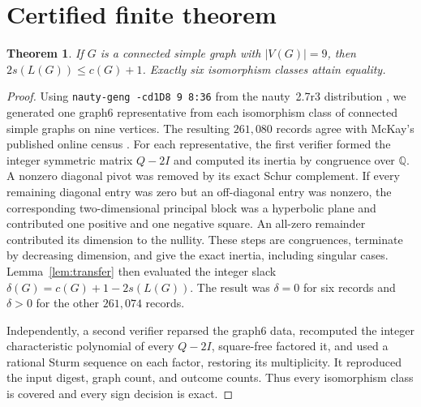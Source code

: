 \documentclass[11pt]{amsart}
\newtheorem{theorem}{Theorem}[section]
\begin{document}
\section{Certified finite theorem}
\begin{theorem}\label{thm:main}
If $G$ is a connected simple graph with $|V(G)|=9$, then
$2s(L(G))\leq c(G)+1$. Exactly six isomorphism classes attain equality.
\end{theorem}
\begin{proof}
Using \texttt{nauty-geng -cd1D8 9 8:36} from the nauty~2.7r3 distribution
\cite{McKay_2014,NautyGuide}, we generated one graph6 representative from
each isomorphism class of connected simple graphs on nine vertices. The
resulting $261{,}080$ records agree with McKay's published online census
\cite{McKayData}. For each representative, the first verifier formed the integer
symmetric matrix $Q-2I$ and computed its inertia by congruence over
$\mathbb Q$. A nonzero diagonal pivot was removed by its exact Schur
complement. If every remaining diagonal entry was zero but an off-diagonal
entry was nonzero, the corresponding two-dimensional principal block was a
hyperbolic plane and contributed one positive and one negative square. An
all-zero remainder contributed its dimension to the nullity. These steps are
congruences, terminate by decreasing dimension, and give the exact inertia,
including singular cases. Lemma~\ref{lem:transfer} then evaluated the integer
slack $\delta(G)=c(G)+1-2s(L(G))$. The result was $\delta=0$ for six records
and $\delta>0$ for the other $261{,}074$ records.

Independently, a second verifier reparsed the graph6 data, recomputed the
integer characteristic polynomial of every $Q-2I$, square-free factored it,
and used a rational Sturm sequence on each factor, restoring its
multiplicity. It reproduced the input digest, graph count, and outcome
counts. Thus every isomorphism class is covered and every sign decision is
exact.
\end{proof}
\end{document}
